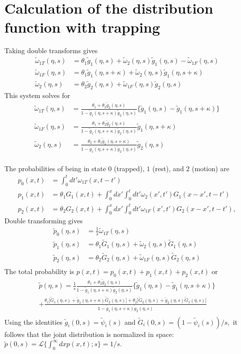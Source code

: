 \documentclass[]{agujournal2018}
\newcommand\tom{\tilde{\omega}}
\newcommand\tg{\tilde{g}}
\newcommand\tp{\tilde{p}}
\newcommand\tG{\tilde{G}}
\begin{document}
\section{Calculation of the distribution function with trapping}
\label{sec:appendix}
Taking double transforms gives
\begin{align}
\tom_{1T}(\eta,s) &= \theta_1 \tg_1(\eta,s) + \tom_2(\eta,s)\tg_1(\eta,s)-\tom_{1F}(\eta,s) \\
\tom_{1F}(\eta,s) &= \theta_1\tg_1(\eta,s+\kappa) + \tom_2(\eta,s)\tg_1(\eta,s+\kappa)\\
\tom_2(\eta,s) &= \theta_2 \tg_2(\eta,s) + \tom_{1F}(\eta,s)\tg_2(\eta,s)
\end{align}
This system solves for 
\begin{align}
\tom_{1T}(\eta,s) &= \frac{\theta_1 + \theta_2 \tg_2(\eta,s)}{1-\tg_1(\eta,s+\kappa)\tg_2(\eta,s)}\big\{\tg_1(\eta,s)-\tg_1(\eta,s+\kappa) \big\} \\
\tom_{1F}(\eta,s) &= \frac{\theta_1 + \theta_2 \tg_2(\eta,s)}{1-\tg_1(\eta,s+\kappa)\tg_2(\eta,s)}\tg_1(\eta,s+\kappa)\\
\tom_{2}(\eta,s) &= \frac{\theta_2 + \theta_1 \tg_1(\eta,s+\kappa)}{1-\tg_1(\eta,s+\kappa)\tg_2(\eta,s)}\tg_2(\eta,s)\\
\end{align}


The probabilities of being in state $0$ (trapped), $1$ (rest), and $2$ (motion) are
\begin{align}
p_0(x,t) &= \int_0^t dt' \omega_{1T}(x,t-t')\\
p_1(x,t) &= \theta_1 G_1(x,t) + \int_0^x dx' \int_0^t dt' \omega_2(x',t')G_1(x-x',t-t')\\
p_2(x,t) &= \theta_2 G_2(x,t) + \int_0^x dx' \int_0^t dt' \omega_{1F}(x',t')G_2(x-x',t-t'),
\end{align}
Double transforming gives
\begin{align}
\tp_0(\eta,s) &= \frac{1}{s}\tom_{1T}(\eta,s)\\
\tp_1(\eta,s) &= \theta_1 \tG_1(\eta,s) + \tom_2(\eta,s) \tG_1(\eta,s) \\
\tp_2(\eta,s) &= \theta_2 \tG_2(\eta,s) + \tom_{1F}(\eta,s)\tG_2(\eta,s)\\
\end{align}
The total probability is $p(x,t) = p_0(x,t) + p_1(x,t) + p_2(x,t)$ or 
\begin{multline}
\tp(\eta,s) = \frac{1}{s}\frac{\theta_1 + \theta_2 \tg_2(\eta,s)}{1-\tg_1(\eta,s+\kappa)\tg_2(\eta,s)}\big\{\tg_1(\eta,s)-\tg_1(\eta,s+\kappa) \big\} \\
+\frac{\theta_1\big[\tG_1(\eta,s) + \tg_1(\eta,s+\kappa)\tG_2(\eta,s)\big]+ \theta_2\big[\tG_2(\eta,s) + \tg_2(\eta,s)\tG_1(\eta,s)\big]}{1-\tg_1(\eta,s+\kappa)\tg_2(\eta,s)} \\
\end{multline}
Using the identities $\tg_i(0,s) = \tilde{\psi}_i(s)$ and $\tG_i(0,s) = (1-\tilde{\psi}_i(s))/s,$ it follows that the joint distribution is normalized in space: $\tp(0,s) = \mathcal{L}\{\int_0^\infty dx p(x,t);s\} = 1/s$.
\end{document}
